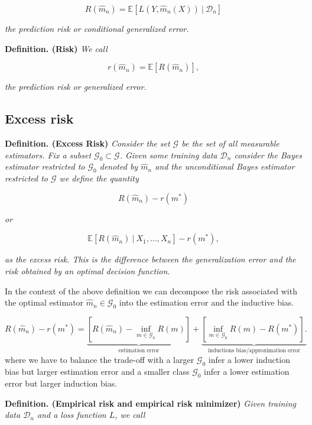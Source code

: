 \documentclass[
]{book}
\begin{document}
\[
R(\hat{m}_n)=\mathbb{E}[L(Y,\hat{m}_n(X))\ \vert\ \mathcal{D}_n]
\]

\emph{the prediction risk or conditional generalized error.}

\textbf{Definition. (Risk)} \emph{We call}

\[
r(\hat{m}_n)=\mathbb{E}[R(\hat{m}_n)],
\]

\emph{the prediction risk or generalized error.}

\hypertarget{excess-risk}{%
\subsection{Excess risk}\label{excess-risk}}

\textbf{Definition. (Excess Risk)} \emph{Consider the set \(\mathcal{G}\) be the set of all measurable estimators. Fix a subset \(\mathcal{G}_0\subset\mathcal{G}\). Given some training data \(\mathcal{D}_n\) consider the Bayes estimator restricted to \(\mathcal{G}_0\) denoted by \(\hat{m}_n\) and the unconditional Bayes estimator restricted to \(\mathcal{G}\) we define the quantity}

\[
R(\hat{m}_n)-r(m^*)
\]

\emph{or}

\[
\mathbb{E}[R(\hat{m}_n)\ \vert\ X_1,...,X_n]-r(m^*),
\]

\emph{as the excess risk. This is the difference between the generalization error and the risk obtained by an optimal decision function.}

In the context of the above definition we can decompose the risk associated with the optimal estimator \(\hat{m}_n\in\mathcal{G}_0\) into the estimation error and the inductive bias.

\[
R(\hat{m}_n)-r(m^*)=\underbrace{\left[R(\hat{m}_n)-\inf_{m\in\mathcal{G}_0}R(m)\right]}_{\text{estimation error}}+\underbrace{\left[\inf_{m\in\mathcal{G}_0}R(m)-R(m^*)\right].}_{\text{inductions bias/approximation error}}
\]
where we have to balance the trade-off with a larger \(\mathcal{G}_0\) infer a lower induction bias but larger estimation error and a smaller class \(\mathcal{G}_0\) infer a lower estimation error but larger induction bias.

\textbf{Definition. (Empirical risk and empirical risk minimizer)} \emph{Given training data \(\mathcal{D}_n\) and a loss function \(L\), we call}
\end{document}
